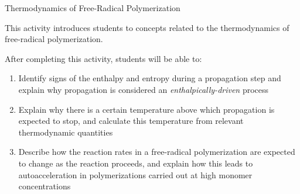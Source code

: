 %
%
%
%

\renewcommand{\figpath}{content/polymchem/freeradical/FRPthermo/figs}
\renewcommand{\labelbase}{FRPthermo}

\begin{activity}{Thermodynamics of Free-Radical Polymerization}

\begin{instructornotes}
	This activity introduces students to concepts related to the thermodynamics of free-radical polymerization.
	
	After completing this activity, students will be able to:
	\begin{enumerate}
		\item Identify signs of the enthalpy and entropy during a propagation step and explain why propagation is considered an \emph{enthalpically-driven} process
		\item Explain why there is a certain temperature above which propagation is expected to stop, and calculate this temperature from relevant thermodynamic quantities
		\item Describe how the reaction rates in a free-radical polymerization are expected to change as the reaction proceeds, and explain how this leads to autoacceleration in polymerizations carried out at high monomer concentrations
	\end{enumerate}
	

\end{instructornotes}
\end{activity}
